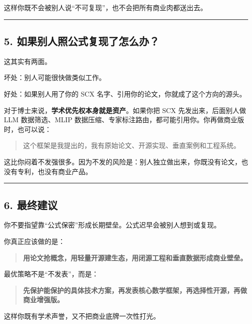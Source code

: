 \documentclass[
  12pt,
]{ctexart}
\begin{document}
这样你既不会被别人说``不可复现''，也不会把所有商业肉都送出去。

\begin{center}\rule{0.5\linewidth}{0.5pt}\end{center}

\subsection{5.
如果别人照公式复现了怎么办？}\label{ux5982ux679cux522bux4ebaux7167ux516cux5f0fux590dux73b0ux4e86ux600eux4e48ux529e}

这其实有两面。

坏处：别人可能很快做类似工作。

好处：如果别人用了你的 SCX 名字、引用你的论文，你就成了这个方向的源头。

对于博士来说，\textbf{学术优先权本身就是资产}。如果你把 SCX
先发出来，后面别人做 LLM 数据筛选、MLIP
数据压缩、专家标注路由，都可能引用你。你再做商业版时，也可以说：

\begin{quote}
这个框架是我提出的，我有原始论文、开源实现、垂直案例和工程系统。
\end{quote}

这比你闷着不发强很多。因为不发的风险是：别人独立做出来，你既没有论文，也没有专利，也没有商业产品。

\begin{center}\rule{0.5\linewidth}{0.5pt}\end{center}

\subsection{6. 最终建议}\label{ux6700ux7ec8ux5efaux8bae-1}

你不要指望靠``公式保密''形成长期壁垒。公式迟早会被别人想到或复现。

你真正应该做的是：

\begin{quote}
\textbf{用论文抢概念，用轻量开源建生态，用闭源工程和垂直数据形成商业壁垒。}
\end{quote}

最优策略不是``不发表''，而是：

\begin{quote}
\textbf{先保护能保护的具体技术方案，再发表核心数学框架，再选择性开源，再做商业增强版。}
\end{quote}

这样你既有学术声誉，又不把商业底牌一次性打光。
\end{document}
